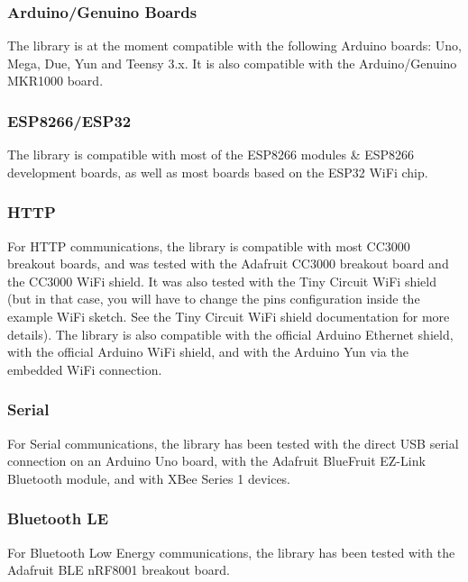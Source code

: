 \subsubsection*{Arduino/\+Genuino Boards}

The library is at the moment compatible with the following Arduino boards\+: Uno, Mega, Due, Yun and Teensy 3.\+x. It is also compatible with the Arduino/\+Genuino M\+K\+R1000 board.

\subsubsection*{E\+S\+P8266/\+E\+S\+P32}

The library is compatible with most of the E\+S\+P8266 modules \& E\+S\+P8266 development boards, as well as most boards based on the E\+S\+P32 Wi\+Fi chip.

\subsubsection*{H\+T\+TP}

For H\+T\+TP communications, the library is compatible with most C\+C3000 breakout boards, and was tested with the Adafruit C\+C3000 breakout board and the C\+C3000 Wi\+Fi shield. It was also tested with the Tiny Circuit Wi\+Fi shield (but in that case, you will have to change the pins configuration inside the example Wi\+Fi sketch. See the Tiny Circuit Wi\+Fi shield documentation for more details). The library is also compatible with the official Arduino Ethernet shield, with the official Arduino Wi\+Fi shield, and with the Arduino Yun via the embedded Wi\+Fi connection.

\subsubsection*{Serial}

For Serial communications, the library has been tested with the direct U\+SB serial connection on an Arduino Uno board, with the Adafruit Blue\+Fruit E\+Z-\/\+Link Bluetooth module, and with X\+Bee Series 1 devices.

\subsubsection*{Bluetooth LE}

For Bluetooth Low Energy communications, the library has been tested with the Adafruit B\+LE n\+R\+F8001 breakout board.

